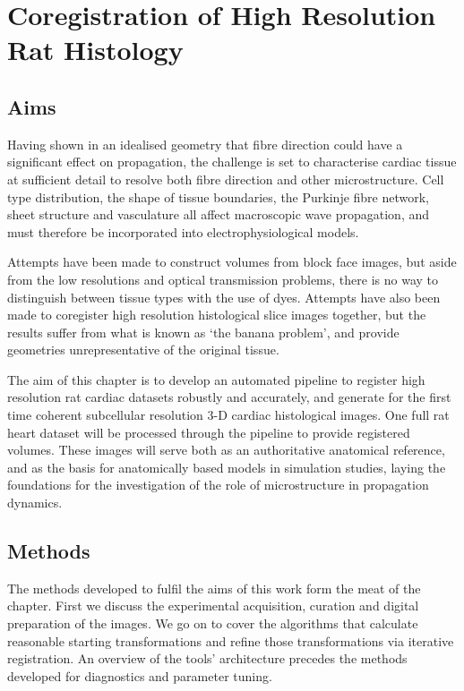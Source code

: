 \chapter{Coregistration of High Resolution Rat Histology} %
\label{cha:coregistration_of_high_resolution_rat_histology}
\dblspace

\section{Aims} %
\label{sec:aims}

  Having shown in an idealised geometry that fibre direction could have a significant effect on propagation, the challenge is set to characterise cardiac tissue at sufficient detail to resolve both fibre direction and other microstructure. Cell type distribution, the shape of tissue boundaries, the Purkinje fibre network, sheet structure and vasculature all affect macroscopic wave propagation, and must therefore be incorporated into electrophysiological models.
	
	Attempts have been made to construct volumes from block face images, but aside from the low resolutions and optical transmission problems, there is no way to distinguish between tissue types with the use of dyes. Attempts have also been made to coregister high resolution histological slice images together, but the results suffer from what is known as `the banana problem', and provide geometries unrepresentative of the original tissue.
	
  The aim of this chapter is to develop an automated pipeline to register high resolution rat cardiac datasets robustly and accurately, and generate for the first time coherent subcellular resolution 3-D cardiac histological images. One full rat heart dataset will be processed through the pipeline to provide registered volumes. These images will serve both as an authoritative anatomical reference, and as the basis for anatomically based models in simulation studies, laying the foundations for the investigation of the role of microstructure in propagation dynamics.
	

\section{Methods} %
\label{sec:methods}
	The methods developed to fulfil the aims of this work form the meat of the chapter. First we discuss the experimental acquisition, curation and digital preparation of the images. We go on to cover the algorithms that calculate reasonable starting transformations and refine those transformations via iterative registration. An overview of the tools' architecture precedes the methods developed for diagnostics and parameter tuning.
	
